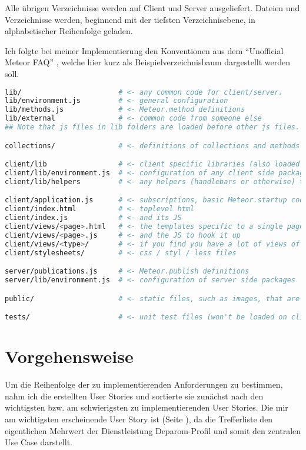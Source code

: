 Alle übrigen Verzeichnisse werden auf Client und Server ausgeliefert. Dateien
und Verzeichnisse werden, beginnend mit der tiefsten Verzeichnisebene, in
alphabetischer Reihenfolge geladen.

Ich folgte bei meiner Implementierung den Konventionen aus dem "`Unofficial
Meteor FAQ"' \cite{meteor-faq}, welche hier kurz als Beispielverzeichnisbaum
dargestellt werden soll.

\begin{lstlisting}[caption=Empfohlene Verzeichnisstruktur für Meteorprojekte \cite{meteor-faq}, language=sh]
lib/                       # <- any common code for client/server.
lib/environment.js         # <- general configuration
lib/methods.js             # <- Meteor.method definitions
lib/external               # <- common code from someone else
## Note that js files in lib folders are loaded before other js files.

collections/               # <- definitions of collections and methods on them (could be models/)

client/lib                 # <- client specific libraries (also loaded first)
client/lib/environment.js  # <- configuration of any client side packages
client/lib/helpers         # <- any helpers (handlebars or otherwise) that are used often in view files

client/application.js      # <- subscriptions, basic Meteor.startup code.
client/index.html          # <- toplevel html
client/index.js            # <- and its JS
client/views/<page>.html   # <- the templates specific to a single page
client/views/<page>.js     # <- and the JS to hook it up
client/views/<type>/       # <- if you find you have a lot of views of the same object type
client/stylesheets/        # <- css / styl / less files

server/publications.js     # <- Meteor.publish definitions
server/lib/environment.js  # <- configuration of server side packages

public/                    # <- static files, such as images, that are served directly.

tests/                     # <- unit test files (won't be loaded on client or server)
\end{lstlisting}

\section{Vorgehensweise}

Um die Reihenfolge der zu implementierenden Anforderungen zu bestimmen, nahm ich
die erstellten User Stories und sortierte sie zunächst nach den wichtigsten bzw.
am schwierigsten zu implementierenden User Stories. Die mir am wichtigsten
erscheinende User Story ist  (Seite
\pageref{ch:SystemEntwurf:07}), da die Trefferliste den eigentlichen Mehrwert
der Dienstleistung Deparom-Profil und somit den zentralen Use Case darstellt.

